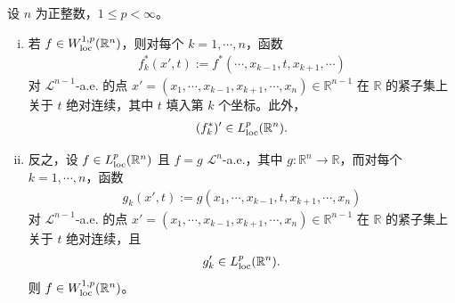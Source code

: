 ﻿\documentclass[../../main.tex]{subfiles}%
\begin{document}
\begin{theorem}\label{theorem:ch04-4-21}
设 $n$ 为正整数，$1\leqslant p<\infty$。
\begin{enumerate}[(i)]
\item 若 $f\in W^{1,p}_{\mathrm{loc}}(\mathbb{R}^{n})$，则对每个 $k=1,\cdots,n$，函数
\begin{align*}
f^{*}_{k}(x',t):=f^{*}(\cdots,x_{k-1},t,x_{k+1},\cdots)
\end{align*}
对 $\mathcal{L}^{n-1}$-a.e. 的点 $x'=(x_{1},\cdots,x_{k-1},x_{k+1},\cdots,x_{n})\in\mathbb{R}^{n-1}$ 在 $\mathbb{R}$ 的紧子集上关于 $t$ 绝对连续，其中 $t$ 填入第 $k$ 个坐标。此外，
\begin{align*}
(f^{*}_{k})'\in L^{p}_{\mathrm{loc}}(\mathbb{R}^{n}).
\end{align*}
\item 反之，设 $f\in L^{p}_{\mathrm{loc}}(\mathbb{R}^{n})$ 且 $f=g$ $\mathcal{L}^{n}$-a.e.，其中 $g:\mathbb{R}^{n}\to\mathbb{R}$，而对每个 $k=1,\cdots,n$，函数
\begin{align*}
g_{k}(x',t):=g(x_{1},\cdots,x_{k-1},t,x_{k+1},\cdots,x_{n})
\end{align*}
对 $\mathcal{L}^{n-1}$-a.e. 的点 $x'=(x_{1},\cdots,x_{k-1},x_{k+1},\cdots,x_{n})\in\mathbb{R}^{n-1}$ 在 $\mathbb{R}$ 的紧子集上关于 $t$ 绝对连续，且
\begin{align*}
g'_{k}\in L^{p}_{\mathrm{loc}}(\mathbb{R}^{n}).
\end{align*}
则 $f\in W^{1,p}_{\mathrm{loc}}(\mathbb{R}^{n})$。
\end{enumerate}
\end{theorem}
\end{document}
